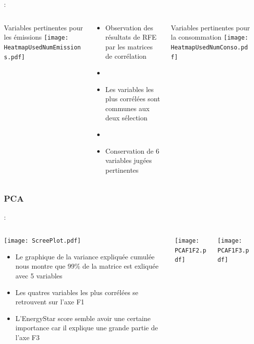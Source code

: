 \documentclass[8pt,aspectratio=169,hyperref={unicode=true}]{beamer}
\begin{document}
\begin{frame}{\insertsection : \insertsubsection}{\insertsubsubsection}
  \begin{columns}[t]
    \begin{column}{.33\textwidth}
      \centering
      Variables pertinentes pour les émissions
      \texttt{[image: HeatmapUsedNumEmissions.pdf]}
    \end{column}
    \begin{column}{.33\textwidth}
      \begin{itemize}
        \item Observation des résultats de RFE par les matrices de corrélation
        \item[]
        \item Les variables les plus corrélées sont communes aux deux sélection
        \item[]
        \item Conservation de 6 variables jugées pertinentes
      \end{itemize}
    \end{column}
    \begin{column}{.33\textwidth}
      \centering
      Variables pertinentes pour la consommation
      \texttt{[image: HeatmapUsedNumConso.pdf]}
    \end{column}
  \end{columns}
\end{frame}

\subsubsection{PCA}
\begin{frame}[t]{\insertsection : \insertsubsection}{\insertsubsubsection}
  \begin{columns}
    \begin{column}{.33\textwidth}
      \texttt{[image: ScreePlot.pdf]}
      \begin{itemize}
        \item Le graphique de la variance expliquée cumulée nous montre que
              99\% de la matrice est exliquée avec 5 variables
        \item Les quatres variables les plus corrélées se retrouvent sur l'axe F1
        \item L'EnergyStar score semble avoir une certaine importance car il explique
              une grande partie de l'axe F3
      \end{itemize}
    \end{column}
    \begin{column}{.33\textwidth}
      \centering
      \texttt{[image: PCAF1F2.pdf]}
    \end{column}
    \begin{column}{.33\textwidth}
      \centering
      \texttt{[image: PCAF1F3.pdf]}
    \end{column}
  \end{columns}
\end{frame}
\end{document}

